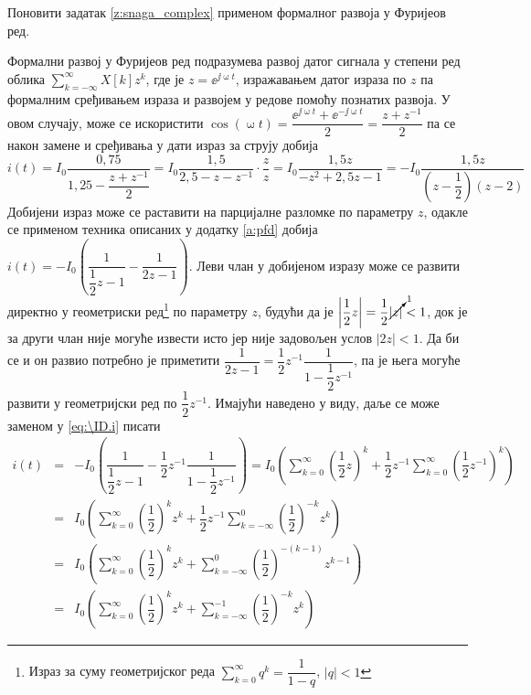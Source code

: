 \PID Поновити задатак \ref{z:snaga_complex} применом формалног развоја у Фуријеов ред. 

\RESENJE

Формални развој у Фуријеов ред подразумева развој датог сигнала у степени ред облика 
$\sum_{k = -\infty}^{\infty} X[k] z^{k}$, где је $z = \ee^{\jj\upomega t}$, изражавањем датог израза по 
$z$ па формалним сређивањем израза и развојем у редове помоћу познатих развоја. У овом случају, може се искористити $\cos(\upomega t) = \dfrac{\ee^{\jj\upomega t} + \ee^{-\jj\upomega t}}{2} 
= \dfrac{z + z^{-1}}{2}$ па се након замене и сређивања у дати израз за струју добија 
\begin{equation}
    i(t) = I_0 \dfrac{0,75}{1,25 - \dfrac{z + z^{-1}}{2} } 
         = I_0 \dfrac{1,5}{2,5 - z - z^{-1}}  
         \cdot 
         \dfrac{z}{z}
         = I_0 \dfrac{1,5 z}{ -z^2 + 2,5 z - 1 } 
         =  -I_0 \dfrac{1,5 z}{ \left( z - \dfrac{1}{2} \right) (z - 2) } \label{eq:\ID.i}
\end{equation}
Добијени израз може се раставити на парцијалне разломке по параметру $z$, одакле се применом техника описаних 
у додатку \ref{a:pfd} добија 
$
    i(t) = -I_0 \left( \dfrac{1}{\dfrac{1}{2}z - 1} - \dfrac{1}{2z - 1} \right). 
$ Леви члан у добијеном изразу може се развити директно у геометриски ред\footnote{Израз за суму геометријског реда 
$\sum_{k = 0}^{\infty} q^k = \dfrac{1}{1 - q}$, $|q| < 1$ } по параметру $z$, будући да је 
$\left\lvert\dfrac{1}{2} z\right\rvert = \dfrac{1}{2} \cancelto{1}{|z|}  < 1$, док је 
за други члан није могуће извести исто јер није задовољен услов $|2z| < 1$. Да би се и он развио потребно је приметити
$
\dfrac{1}{2z - 1} = \dfrac{1}{2}z^{-1} \dfrac{1}{1 - \dfrac{1}{2}z^{-1} }
$, па је њега могуће развити у геометријски ред по $\dfrac{1}{2}z^{-1}$. Имајући наведено у виду, даље се може 
заменом у \eqref{eq:\ID.i} писати
\begin{eqnarray}
    i(t) &=& -I_0 \left(
        \dfrac{1}{\dfrac{1}{2}z - 1} - \dfrac{1}{2}z^{-1} \dfrac{1}{1 - \dfrac{1}{2}z^{-1} }    
    \right) = I_0 \left(
      \sum_{k = 0}^{\infty} \left(\dfrac{1}{2}z \right)^k + \dfrac{1}{2} z^{-1} \sum_{k = 0}^{\infty} \left(\dfrac{1}{2} z^{-1} \right)^k     
    \right) \\[2mm]
    &=&
    I_0 \left(
        \sum_{k = 0}^{\infty} \left(\dfrac{1}{2} \right)^k z^k + \dfrac{1}{2} z^{-1} \sum_{k = -\infty}^{0} \left(\dfrac{1}{2}\right)^{-k} z^{k}     
    \right)
    \\[2mm] &=&
    I_0 \left(
        \sum_{k = 0}^{\infty} \left(\dfrac{1}{2} \right)^k z^k + \sum_{k = -\infty}^{0} \left(\dfrac{1}{2}\right)^{-(k-1)} z^{k-1}     
    \right) \\[2mm]
        &=&
    I_0 \left(
        \sum_{k = 0}^{\infty} \left(\dfrac{1}{2} \right)^k z^k + \sum_{k = -\infty}^{-1} \left(\dfrac{1}{2}\right)^{-k} z^k     
    \right)
\end{eqnarray}
